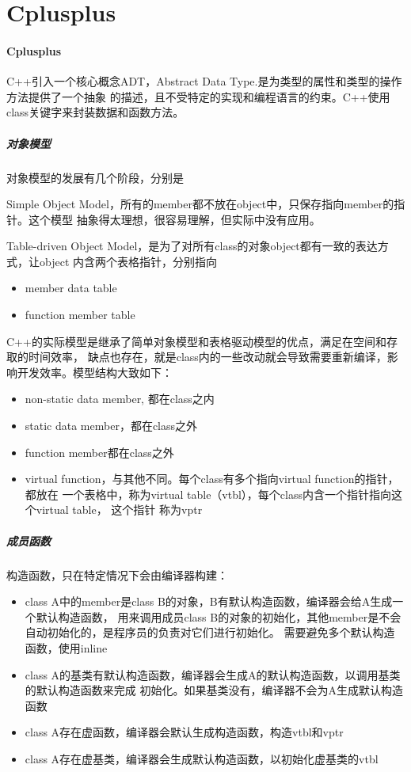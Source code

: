 \clearpage
\part{Cplusplus}

\subsection{Cplusplus}
C++引入一个核心概念ADT，Abstract Data Type.是为类型的属性和类型的操作方法提供了一个抽象
的描述，且不受特定的实现和编程语言的约束。C++使用class关键字来封装数据和函数方法。

\subsubsection{对象模型}
对象模型的发展有几个阶段，分别是

Simple Object Model，所有的member都不放在object中，只保存指向member的指针。这个模型
抽象得太理想，很容易理解，但实际中没有应用。

Table-driven Object Model，是为了对所有class的对象object都有一致的表达方式，让object
内含两个表格指针，分别指向
\begin{itemize}
    \item {member data table}
    \item {function member table}
\end{itemize}

C++的实际模型是继承了简单对象模型和表格驱动模型的优点，满足在空间和存取的时间效率，
缺点也存在，就是class内的一些改动就会导致需要重新编译，影响开发效率。模型结构大致如下：
\begin{itemize}
    \item {non-static data member, 都在class之内}
    \item {static data member，都在class之外}
    \item {function member都在class之外}
    \item {virtual function，与其他不同。每个class有多个指向virtual function的指针，都放在
    一个表格中，称为virtual table（vtbl），每个class内含一个指针指向这个virtual table， 这个指针
    称为vptr}
\end{itemize}

\subsubsection{成员函数}
构造函数，只在特定情况下会由编译器构建：
\begin{itemize}
    \item {class A中的member是class B的对象，B有默认构造函数，编译器会给A生成一个默认构造函数，
    用来调用成员class B的对象的初始化，其他member是不会自动初始化的，是程序员的负责对它们进行初始化。
    需要避免多个默认构造函数，使用inline}
    \item {class A的基类有默认构造函数，编译器会生成A的默认构造函数，以调用基类的默认构造函数来完成
    初始化。如果基类没有，编译器不会为A生成默认构造函数}
    \item {class A存在虚函数，编译器会默认生成构造函数，构造vtbl和vptr}
    \item {class A存在虚基类，编译器会生成默认构造函数，以初始化虚基类的vtbl}
\end{itemize}

